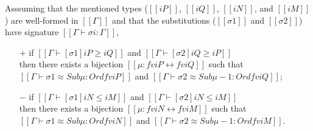 \begin{lemma} \label{lemma:mutual-subst-subtyping}
  Asssuming that the mentioned types ($[[iP]]$, $[[iQ]]$, $[[iN]]$, and $[[iM]]$)
  are well-formed in $[[Γ]]$ and that the substitutions ($[[σ1]]$ and $[[σ2]]$) have signature $[[Γ ⊢ σi : Γ]]$,
  \begin{itemize}
  \item[$+$] if $[[Γ ⊢ [σ1] iP ≥ iQ]]$ and $[[Γ ⊢ [σ2] iQ ≥ iP]]$\\
    then there exists a bijection $[[μ : fv iP ↔ fv iQ]]$ such that
    $[[Γ ⊢ σ1 ≈ Sub μ : Ord fv iP]]$ and $[[Γ ⊢ σ2 ≈ Sub μ-1 : Ord fv iQ]]$;
  \item[$-$] if $[[Γ ⊢ [σ1] iN ≤ iM]]$ and $[[Γ ⊢ [σ2] iN ≤ iM]]$\\
    then there exists a bijection $[[μ : fv iN ↔ fv iM]]$ such that
    $[[Γ ⊢ σ1 ≈ Sub μ : Ord fv iN]]$ and $[[Γ ⊢ σ2 ≈ Sub μ-1 : Ord fv iM]]$.
  \end{itemize}
\end{lemma}
